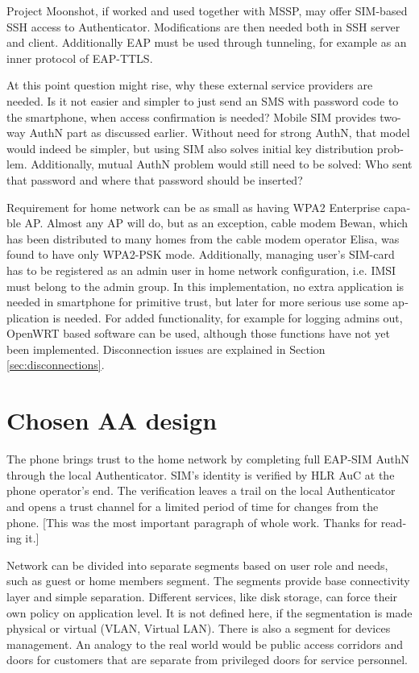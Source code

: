 \documentclass[12pt,a4paper,english]{tutthesis}
\begin{document}
\begin{otherlanguage}{english}
Project Moonshot\cite{moonshot}, if worked and used together with MSSP, may offer
SIM-based SSH access to Authenticator. Modifications are then needed 
both in SSH server and client. Additionally EAP must be used through
tunneling, for example as an inner protocol of EAP-TTLS.

At this point question might rise, why these external service
providers are needed. Is it not easier and simpler to just send 
an SMS with password code to the smartphone, when access confirmation is needed?
Mobile SIM provides two-way AuthN part as discussed earlier.
Without need for strong AuthN, that model would indeed be 
simpler, but using SIM also solves initial key distribution problem.
Additionally, mutual AuthN problem would still need to be solved:
Who sent that password and where that password should be inserted?





Requirement for home network can be as small as having WPA2 Enterprise capable
AP. Almost any AP will do, but as an exception, cable modem Bewan, which 
has been distributed to many homes from the cable modem operator Elisa, was found to have only WPA2-PSK mode.
Additionally, managing user's SIM-card has to be registered as an admin user in home network 
configuration, i.e. IMSI must belong to the admin group.
In this implementation, no extra application is needed in smartphone
for primitive trust, but later for more serious use some application is needed.
For added functionality, for example for logging admins out, OpenWRT
based software can be used, although those functions have not yet been
implemented. Disconnection issues are explained in Section
\ref{sec:disconnections}.

\section{Chosen AA design}
\label{sec-4-2}
\label{sec:chosendesign}

The phone brings trust to the home network by completing full EAP-SIM AuthN through
the local Authenticator. SIM's identity is verified by HLR AuC at the phone
operator's end. The verification leaves a trail on the local Authenticator and
opens a trust channel for a limited period of time for changes from the phone.
[This was the most important paragraph of whole work. Thanks for
reading it.]



Network can be divided into separate segments based on user role and
needs, such as guest or home members segment. The segments provide
base connectivity layer and simple separation. Different
services, like disk storage, can force their own policy on application
level.
It is not defined here, if the segmentation is made 
physical or virtual (VLAN, Virtual LAN). 
There is also a segment for devices management. 
An analogy to the real world would be public access corridors and doors for
customers that are separate from privileged doors for service personnel.



\end{otherlanguage}
\end{document}
